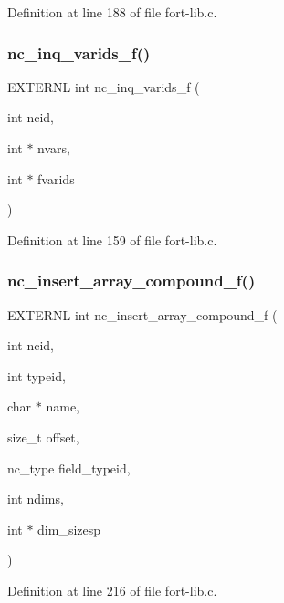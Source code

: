 Definition at line 188 of file fort-\/lib.\+c.

\mbox{\label{fort-lib_8c_af5866b3dc8aa57cff7d29d7c879e9e4f}} 
\subsubsection{\texorpdfstring{nc\+\_\+inq\+\_\+varids\+\_\+f()}{nc\_inq\_varids\_f()}}
{\footnotesize\ttfamily E\+X\+T\+E\+R\+NL int nc\+\_\+inq\+\_\+varids\+\_\+f (\begin{DoxyParamCaption}\item[{int}]{ncid,  }\item[{int $\ast$}]{nvars,  }\item[{int $\ast$}]{fvarids }\end{DoxyParamCaption})}



Definition at line 159 of file fort-\/lib.\+c.

\mbox{\label{fort-lib_8c_aa1f760fcfe94404d16891cdfcc9463d8}} 
\subsubsection{\texorpdfstring{nc\+\_\+insert\+\_\+array\+\_\+compound\+\_\+f()}{nc\_insert\_array\_compound\_f()}}
{\footnotesize\ttfamily E\+X\+T\+E\+R\+NL int nc\+\_\+insert\+\_\+array\+\_\+compound\+\_\+f (\begin{DoxyParamCaption}\item[{int}]{ncid,  }\item[{int}]{typeid,  }\item[{char $\ast$}]{name,  }\item[{size\+\_\+t}]{offset,  }\item[{nc\+\_\+type}]{field\+\_\+typeid,  }\item[{int}]{ndims,  }\item[{int $\ast$}]{dim\+\_\+sizesp }\end{DoxyParamCaption})}



Definition at line 216 of file fort-\/lib.\+c.

